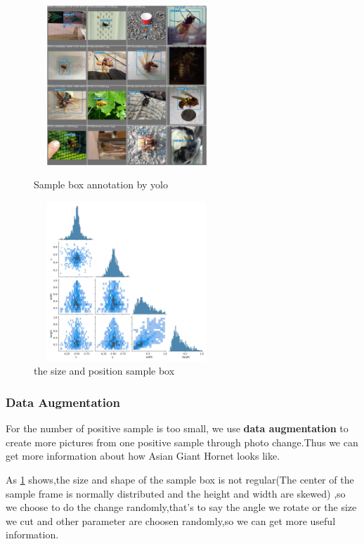 \documentclass[12pt]{article}
\begin{document}
\begin{figure}[H]
	\small
	\centering
	\begin{minipage}{7cm}
		\includegraphics[width=7cm,height=6cm]{./pictures/machine1.png}
		\caption{Sample box annotation by yolo}\label{nt}
	\end{minipage}
	\begin{minipage}{7cm}
		\includegraphics[width=7cm,height=6cm]{./pictures/picture_correlogram.png}
		\caption{the size and position sample box\protect\footnotemark[1]}
		\label{box}
	\end{minipage}
\end{figure}

\subsubsection{Data Augmentation}
For the number of positive sample is too small, we use \textbf{data augmentation} to create more pictures from one positive sample through photo change.Thus we can get more information about how Asian Giant Hornet looks like.

As \ref{box} shows,the size and shape of the sample box is not regular(The center of the sample frame is normally distributed and the height and width are skewed) ,so we choose to do the change randomly,that's to say the angle we rotate or the size we cut and other parameter are choosen randomly,so we can get more useful information.
\end{document}
